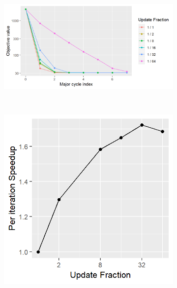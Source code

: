 \begin{figure}[h]
	\centering
	\begin{subfigure}[b]{0.7\linewidth}
		\includegraphics[width=\linewidth]{./chapters/10.results/gradient/ApproxUpdate/size.png}
	\end{subfigure}
	\\
	\begin{subfigure}[b]{0.35\linewidth}
		\includegraphics[width=\linewidth]{./chapters/10.results/gradient/ApproxUpdate/speedup_iter.png}
	\end{subfigure}
	\begin{subfigure}[b]{0.35\linewidth}

\end{subfigure}
\end{figure}

